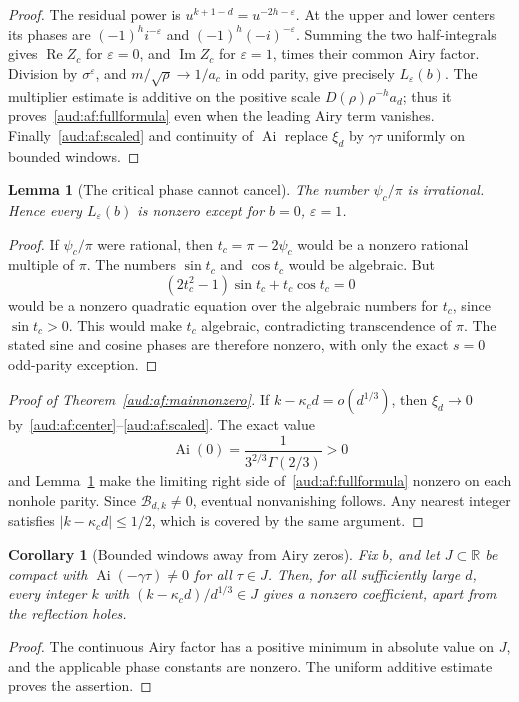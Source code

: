 \documentclass[11pt,a4paper]{article}
\numberwithin{equation}{section}
\newtheorem{lemma}[theorem]{Lemma}
\newtheorem{corollary}[theorem]{Corollary}
\newcommand{\Ai}{\operatorname{Ai}}
\begin{document}
\begin{proof}
The residual power is $u^{k+1-d}=u^{-2h-\varepsilon}$. At the upper and lower centers its phases are $(-1)^hi^{-\varepsilon}$ and $(-1)^h(-i)^{-\varepsilon}$. Summing the two half-integrals gives $\operatorname{Re}Z_c$ for $\varepsilon=0$, and $\operatorname{Im}Z_c$ for $\varepsilon=1$, times their common Airy factor. Division by $\sigma^\varepsilon$, and $m/\sqrt\rho\to1/a_c$ in odd parity, give precisely $L_\varepsilon(b)$. The multiplier estimate is additive on the positive scale $D(\rho)\rho^{-h}a_d$; thus it proves~\eqref{aud:af:fullformula} even when the leading Airy term vanishes. Finally~\eqref{aud:af:scaled} and continuity of $\Ai$ replace $\xi_d$ by $\gamma\tau$ uniformly on bounded windows.
\end{proof}

\begin{lemma}[The critical phase cannot cancel]\label{aud:af:irrational}
The number $\psi_c/\pi$ is irrational. Hence every $L_\varepsilon(b)$ is nonzero except for $b=0$, $\varepsilon=1$.
\end{lemma}
\begin{proof}
If $\psi_c/\pi$ were rational, then $t_c=\pi-2\psi_c$ would be a nonzero rational multiple of $\pi$. The numbers $\sin t_c$ and $\cos t_c$ would be algebraic. But
\[
 (2t_c^2-1)\sin t_c+t_c\cos t_c=0
\]
would be a nonzero quadratic equation over the algebraic numbers for $t_c$, since $\sin t_c>0$. This would make $t_c$ algebraic, contradicting transcendence of $\pi$. The stated sine and cosine phases are therefore nonzero, with only the exact $s=0$ odd-parity exception.
\end{proof}

\begin{proof}[Proof of Theorem~\ref{aud:af:mainnonzero}]
If $k-\kappa_cd=o(d^{1/3})$, then $\xi_d\to0$ by~\eqref{aud:af:center}--\eqref{aud:af:scaled}. The exact value~\cite{dlmf-airy}
\[
 \Ai(0)=\frac1{3^{2/3}\Gamma(2/3)}>0
\]
and Lemma~\ref{aud:af:irrational} make the limiting right side of~\eqref{aud:af:fullformula} nonzero on each nonhole parity. Since $\mathcal B_{d,k}\ne0$, eventual nonvanishing follows. Any nearest integer satisfies $|k-\kappa_cd|\le1/2$, which is covered by the same argument.
\end{proof}

\begin{corollary}[Bounded windows away from Airy zeros]\label{aud:af:window}
Fix $b$, and let $J\subset\mathbb R$ be compact with $\Ai(-\gamma\tau)\ne0$ for all $\tau\in J$. Then, for all sufficiently large $d$, every integer $k$ with $(k-\kappa_cd)/d^{1/3}\in J$ gives a nonzero coefficient, apart from the reflection holes.
\end{corollary}
\begin{proof}
The continuous Airy factor has a positive minimum in absolute value on $J$, and the applicable phase constants are nonzero. The uniform additive estimate proves the assertion.
\end{proof}
\end{document}
